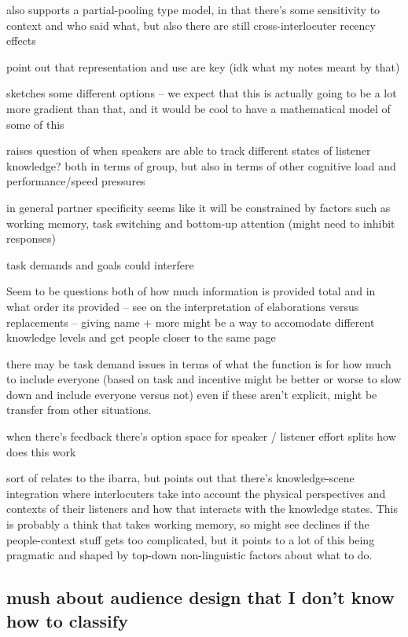 \documentclass[]{article}
\begin{document}
\cite{yoon2014} also supports a partial-pooling type model, in that there's some sensitivity to context and who said what, but also there are still cross-interlocuter recency effects

\cite{yoon2014} point out that representation and use are key (idk what my notes meant by that) 


\cite{yoon2018} sketches some different options -- we expect that this is actually going to be a lot more gradient than that, and it would be cool to have a mathematical model of some of this

\cite{yoon2018} raises question of when speakers are able to track different states of listener knowledge? both in terms of group, but also in terms of other cognitive load and performance/speed pressures 

in general partner specificity seems like it will be constrained by factors such as working memory, task switching and bottom-up attention (might need to inhibit responses) 

task demands and goals could interfere

Seem to be questions both of how much information is provided total and in what order its provided -- see \cite{yoon2018} on the interpretation of elaborations versus replacements -- giving name + more might be a way to accomodate different knowledge levels and get people closer to the same page 

\cite{yoon2019} there may be task demand issues in terms of what the function is for how much to include everyone (based on task and incentive might be better or worse to slow down and include everyone versus not) even if these aren't explicit, might be transfer from other situations. 

\cite{yoon2019} when there's feedback there's option space for speaker / listener effort splits how does this work 

sort of relates to the ibarra, but \cite{yoon2019a} points out that there's knowledge-scene integration where interlocuters take into account the physical perspectives and contexts of their listeners and how that interacts with the knowledge states. This is probably a think that takes working memory, so might see declines if the people-context stuff gets too complicated, but it points to a lot of this being pragmatic and shaped by top-down non-linguistic factors about what to do. 




\subsection{mush about audience design that I don't know how to classify}
\end{document}
